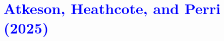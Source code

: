 \documentclass{beamer}
\begin{document}
		

\section{\textcolor{blue}{Atkeson, Heathcote, and Perri (2025)}}
\end{document}
